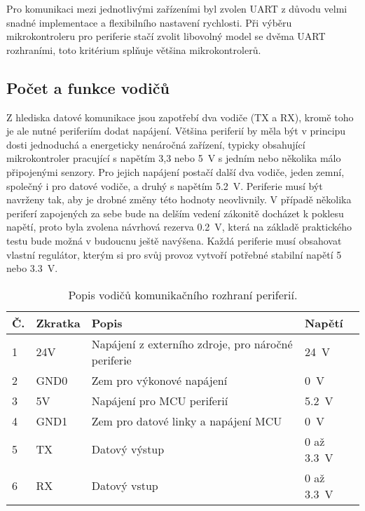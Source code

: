         Pro komunikaci mezi jednotlivými zařízeními byl zvolen UART z důvodu velmi snadné implementace a flexibilního nastavení rychlosti. Při výběru mikrokontroleru pro periferie stačí zvolit libovolný model se dvěma UART rozhraními, toto kritérium splňuje většina mikrokontrolerů.


    \subsection{Počet a funkce vodičů}
        Z hlediska datové komunikace jsou zapotřebí dva vodiče (TX a RX), kromě toho je ale nutné periferiím dodat napájení. Většina periferií by měla být v principu dosti jednoduchá a energeticky nenáročná zařízení, typicky obsahující mikrokontroler pracující s napětím 3,3 nebo \qty{5}{V} s jedním nebo několika málo připojenými senzory. Pro jejich napájení postačí další dva vodiče, jeden zemní, společný i pro datové vodiče, a druhý s napětím \qty{5.2}{V}. Periferie musí být navrženy tak, aby je drobné změny této hodnoty neovlivnily. V případě několika periferí zapojených za sebe bude na delším vedení zákonitě docházet k poklesu napětí, proto byla zvolena návrhová rezerva \qty{0.2}{V}, která na základě praktického testu bude možná v budoucnu ještě navýšena. Každá periferie musí obsahovat vlastní regulátor, kterým si pro svůj provoz vytvoří potřebné stabilní napětí 5 nebo \qty{3,3}{V}. 
        \begin{table}[h!]
            \centering
            \caption{Popis vodičů komunikačního rozhraní periferií.}
            \label{tab:sbernice-popis-vodicu}
            \begin{tabular}{|l|l|l|l|}
                \hline
                \textbf{Č.} & \textbf{Zkratka} & \textbf{Popis} & \textbf{Napětí} \\
                \hline
                1 & 24V & Napájení z externího zdroje, pro náročné periferie & \qty{24}{V} \\
                \hline
                2 & GND0 & Zem pro výkonové napájení & \qty{0}{V}\\
                \hline
                3 & 5V & Napájení pro MCU periferií & \qty{5.2}{V}\\
                \hline
                4 & GND1 & Zem pro datové linky a napájení MCU & \qty{0}{V}\\
                \hline
                5 & TX & Datový výstup & 0 až \qty{3.3}{V}\\
                \hline
                6 & RX & Datový vstup & 0 až \qty{3.3}{V}\\
                \hline
            \end{tabular}
        \end{table}


